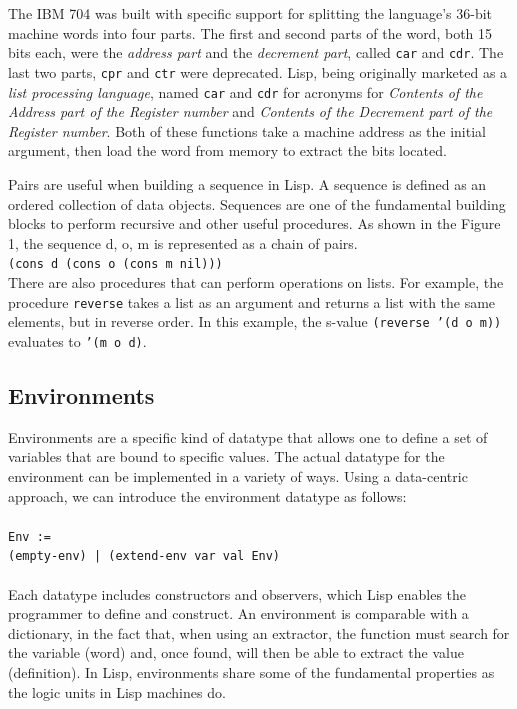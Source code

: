 \documentclass[journal]{IEEEtran}
\begin{document}
The IBM 704 was built with specific support for splitting the language's 36-bit machine words into four parts. The first and second parts of the word, both 15 bits each, were the \textit{address part} and the \textit{decrement part}, called \texttt{car} and \texttt{cdr}. The last two parts, \texttt{cpr} and \texttt{ctr} were deprecated. Lisp, being originally marketed as a \textit{list processing language}, named \texttt{car} and \texttt{cdr} for acronyms for \textit{Contents of the Address part of the Register number} and \textit{Contents of the Decrement part of the Register number}. Both of these functions take a machine address as the initial argument, then load the word from memory to extract the bits located.

Pairs are useful when building a sequence in Lisp. A sequence is defined as an ordered collection of data objects. Sequences are one of the fundamental building blocks to perform recursive and other useful procedures. As shown in the Figure 1, the sequence d, o, m is represented as a chain of pairs.\\

\texttt{(cons d (cons o (cons m nil)))}\\

There are also procedures that can perform operations on lists. For example, the procedure \texttt{reverse} takes a list as an argument and returns a list with the same elements, but in reverse order. In this example, the s-value \texttt{(reverse '(d o m))} evaluates to \texttt{'(m o d)}.


\subsection{Environments}
Environments are a specific kind of datatype that allows one to define a set of variables that are bound to specific values. The actual datatype for the environment can be implemented in a variety of ways. Using a data-centric approach, we can introduce the environment datatype as follows:\\\\
\texttt{Env :=}\\\texttt{(empty-env) | (extend-env var val Env)}\\\\Each datatype includes constructors and observers, which Lisp enables the programmer to define and construct. An environment is comparable with a dictionary, in the fact that, when using an extractor, the function must search for the variable (word) and, once found, will then be able to extract the value (definition). In Lisp, environments share some of the fundamental properties as the logic units in Lisp machines do.
\end{document}
